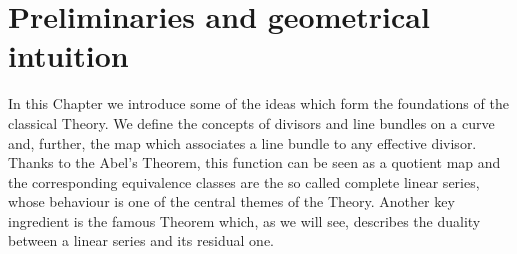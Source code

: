 

\chapter{Preliminaries and geometrical intuition}


\ifpdf
    \graphicspath{{figures/}{figures/}{figures/}}
\else
    \graphicspath{{figures/}{figures/}}
\fi



\nocite{*}

In this Chapter we introduce some of the ideas which form the foundations of the classical \BN Theory. 
We define the concepts of divisors and line bundles on a curve and, further, the \AJJ map which associates a line bundle to any effective divisor.
Thanks to the Abel's Theorem, this function can be seen as a quotient map and the corresponding equivalence classes are the so called complete linear series, whose behaviour is one of the central themes of the Theory.
Another key ingredient is the famous \RR Theorem which, as we will see, describes the duality between a linear series and its residual one.

